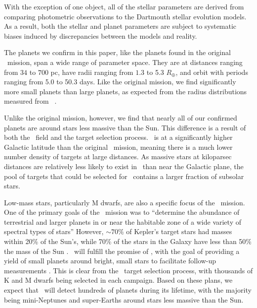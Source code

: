 With the exception of one object, all of the stellar parameters are derived from comparing
photometric observations to the Dartmouth stellar evolution models.
As a result, both the stellar and planet parameters are subject to systematic biases induced
by discrepancies between the models and reality.


The planets we confirm in this paper, like the planets found in the original \kep\ mission,
span a wide range of parameter space.
They are at distances ranging from $34$ to $700$ pc, have radii ranging from $1.3$ to
5.3 $R_\oplus$, and orbit with periods ranging from 5.0 to 50.3 days.
Like the original mission, we find significantly more small planets than large planets, as
expected from the radius distributions measured from \kep\
\citep{Howard12, Fressin13, Morton14}.

Unlike the original mission, however, we find that nearly all of our confirmed planets
are around stars less massive than the Sun.
This difference is a result of both the \Ci\ field and the target selection process.
\Ci\ is at a significantly higher Galactic latitude than the original \kep\ mission,
meaning there is a much lower number density of targets at large distances.
As massive stars
at kiloparsec distances are relatively less likely to exist in \Ci\ than near the
Galactic plane, the pool of targets that could be selected for \Ci\ contains a larger
fraction of subsolar stars.

Low-mass stars, particularly M dwarfs, are also a specific focus of the \KT\ mission.
One of the primary goals of the \kep\ mission was to ``determine the abundance of
terrestrial and larger planets in or near the habitable zone of a wide variety of spectral
types of stars'' \citep{Batalha13} However, $\sim70\%$ of Kepler's target stars had
masses within 20\%
of the Sun's, while 70\% of the stars in the Galaxy have less than 50\% the mass of the
Sun \citep{Brown11}.
\KT\ will fulfill the promise of \kep, with the goal of providing a yield of small planets
around bright, small stars to facilitate follow-up measurements \citep{Howell14}.
This is clear from the \KT\ target selection process, with thousands of K and M dwarfs
being selected in each campaign.
Based on these plans, we expect that \KT\ will detect hundreds of planets during its
lifetime, with the majority being mini-Neptunes and super-Earths around stars
less massive than the Sun.







%
%

%

%

%



